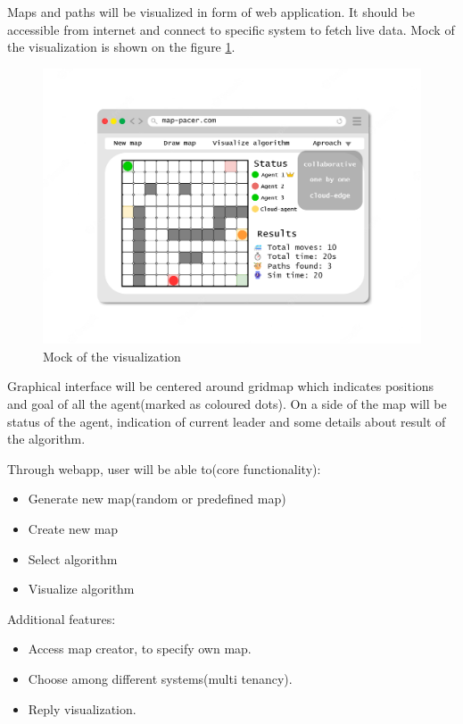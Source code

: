 Maps and paths will be visualized in form of web application. It should be accessible from internet and connect to specific system to fetch live data. Mock of the visualization is shown on the figure \ref{fig:vis_mock}. 

\begin{figure}[H]
    \centering
    \includegraphics[width=\textwidth]{pictures/frontenf_mock.png}
    \caption{ Mock of the visualization }
    \label{fig:vis_mock}
\end{figure}

Graphical interface will be centered around gridmap which indicates positions and goal of all the agent(marked as coloured dots). On a side of the map will be status of the agent, indication of current leader and some details about result of the algorithm.

Through webapp, user will be able to(core functionality):
\begin{itemize}
\itemsep0em 
    \item Generate new map(random or predefined map)
    \item Create new map
    \item Select algorithm
    \item Visualize algorithm
\end{itemize}
Additional features:
\begin{itemize}
\itemsep0em 
    \item Access map creator, to specify own map.
    \item Choose among different systems(multi tenancy).
    \item Reply visualization.
\end{itemize}